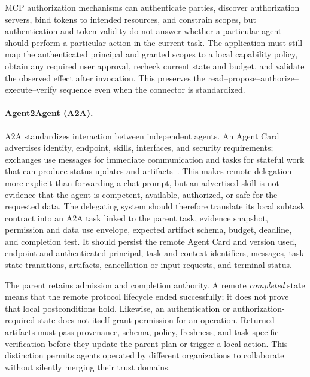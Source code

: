 MCP authorization mechanisms can authenticate parties, discover authorization servers, bind tokens to intended resources, and constrain scopes, but authentication and token validity do not answer whether a particular agent should perform a particular action in the current task. The application must still map the authenticated principal and granted scopes to a local capability policy, obtain any required user approval, recheck current state and budget, and validate the observed effect after invocation. This preserves the read--propose--authorize--execute--verify sequence even when the connector is standardized.

\paragraph{Agent2Agent (A2A).}
A2A standardizes interaction between independent agents. An Agent Card advertises identity, endpoint, skills, interfaces, and security requirements; exchanges use messages for immediate communication and tasks for stateful work that can produce status updates and artifacts~\cite{a2a2026spec}. This makes remote delegation more explicit than forwarding a chat prompt, but an advertised skill is not evidence that the agent is competent, available, authorized, or safe for the requested data. The delegating system should therefore translate its local subtask contract into an A2A task linked to the parent task, evidence snapshot, permission and data use envelope, expected artifact schema, budget, deadline, and completion test. It should persist the remote Agent Card and version used, endpoint and authenticated principal, task and context identifiers, messages, task state transitions, artifacts, cancellation or input requests, and terminal status.

The parent retains admission and completion authority. A remote \emph{completed} state means that the remote protocol lifecycle ended successfully; it does not prove that local postconditions hold. Likewise, an authentication or authorization-required state does not itself grant permission for an operation. Returned artifacts must pass provenance, schema, policy, freshness, and task-specific verification before they update the parent plan or trigger a local action. This distinction permits agents operated by different organizations to collaborate without silently merging their trust domains.

